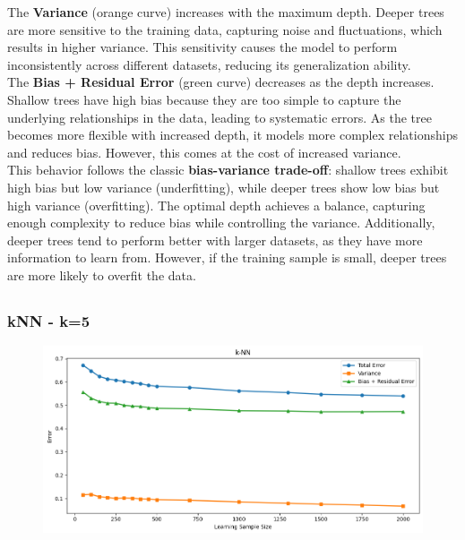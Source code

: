 \documentclass[a4paper,10pt]{article}
\begin{document}
The \textbf{Variance} (orange curve) increases with the maximum depth. Deeper trees are more sensitive to the training data, capturing noise and fluctuations, which results in higher variance. This sensitivity causes the model to perform inconsistently across different datasets, reducing its generalization ability.\\

The \textbf{Bias + Residual Error} (green curve) decreases as the depth increases. Shallow trees have high bias because they are too simple to capture the underlying relationships in the data, leading to systematic errors. As the tree becomes more flexible with increased depth, it models more complex relationships and reduces bias. However, this comes at the cost of increased variance.\\

This behavior follows the classic \textbf{bias-variance trade-off}: shallow trees exhibit high bias but low variance (underfitting), while deeper trees show low bias but high variance (overfitting). The optimal depth achieves a balance, capturing enough complexity to reduce bias while controlling the variance. Additionally, deeper trees tend to perform better with larger datasets, as they have more information to learn from. However, if the training sample is small, deeper trees are more likely to overfit the data.\\




    

\subsection{}

\subsubsection{kNN - k=5}

\begin{figure}[H]
    \centering
    \includegraphics[width=1\linewidth]{zaeeaeza.png}
\end{figure}
\end{document}
